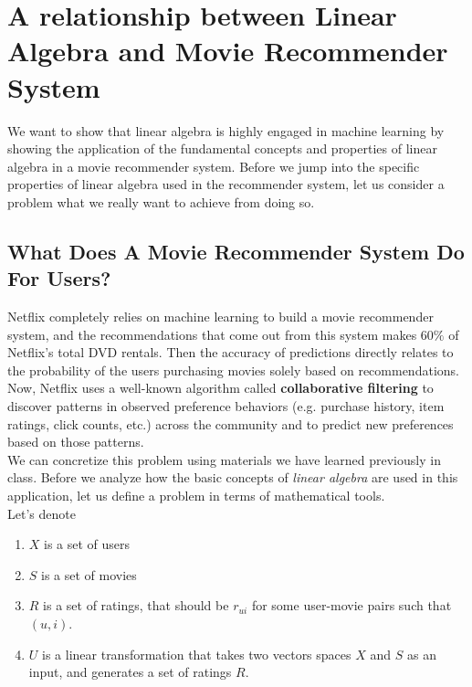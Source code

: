 \documentclass[paper=letter, fontsize=12pt]{scrartcl} %
\numberwithin{equation}{section} %
\numberwithin{figure}{section} %
\numberwithin{table}{section} %
\begin{document}
\pagebreak

\section{A relationship between Linear Algebra and Movie Recommender System}

We want to show that linear algebra is highly engaged in machine learning
by showing the application of the fundamental concepts and properties of linear algebra in a movie recommender system. Before we jump into the specific
properties of linear algebra used in the recommender system,
let us consider a problem what we really want to achieve from doing so.

\bigskip

\subsection{What Does A Movie Recommender System Do For Users?}

Netflix completely relies on machine learning to build a movie recommender system, and the recommendations that come out from this system makes \(60\%\)
of Netflix's total DVD rentals. Then the accuracy of predictions directly relates to the probability of the users purchasing movies solely based on recommendations.
Now, Netflix uses a well-known algorithm called \textbf{collaborative filtering} to discover patterns in observed preference behaviors (e.g. purchase history, item ratings, click counts, etc.) across the community and to predict new preferences based on those patterns. \\

We can concretize this problem using materials we have learned previously in class.
Before we analyze how the basic concepts of \textit{linear algebra} are used in this application, let us define a problem in terms of mathematical tools. \\

Let's denote

\begin{enumerate}
	\item \(X\) is a set of users
	\item \(S\) is a set of movies
  \item \(R\) is a set of ratings, that should be \(r_{ui}\) for some user-movie
    pairs such that \((u,i)\).
  \item \(U\) is a linear transformation that takes two vectors spaces \(X\) and
    \(S\) as an input, and generates a set of ratings \(R\).
  \end{enumerate}
\end{document}
